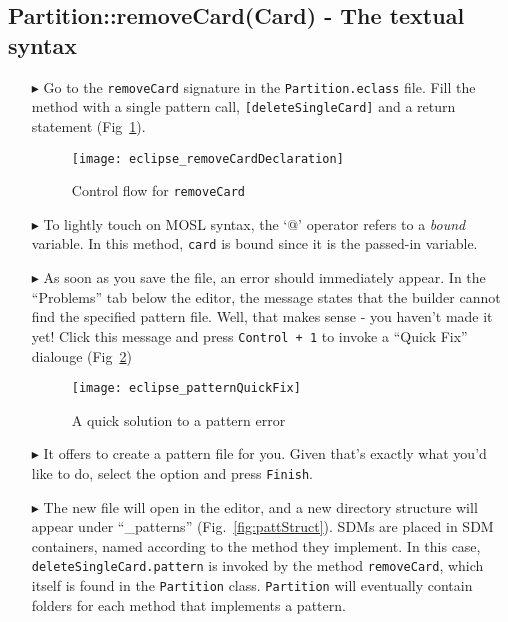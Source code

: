 \newpage
\hypertarget{remCard tex}{}
\subsection{Partition::removeCard(Card) - The textual syntax}
\texHeader

\begin{itemize}

\item[$\blacktriangleright$] Go to the \texttt{removeCard} signature in the \texttt{Partition.eclass} file. Fill the method with a single pattern call,
\texttt{[deleteSingleCard]} and a return statement (Fig~\ref{fig:remCardDec}).

\begin{figure}[htp]
\begin{center}
  \texttt{[image: eclipse\_removeCardDeclaration]}
  \caption{Control flow for \texttt{removeCard}}
  \label{fig:remCardDec}
\end{center}
\end{figure}

\item[$\blacktriangleright$] To lightly touch on MOSL syntax, the `@' operator refers to a \emph{bound} variable. In this method, \texttt{card} is bound since
it is the passed-in variable.

\item[$\blacktriangleright$] As soon as you save the file, an error should immediately appear. In the ``Problems'' tab below the editor, the message states that
the builder cannot find the specified pattern file. Well, that makes sense - you haven't made it yet! Click this message and press \texttt{Control + 1} to
invoke a ``Quick Fix'' dialouge (Fig~\ref{fig:quixFix})

\begin{figure}[htp]
\begin{center}
  \texttt{[image: eclipse\_patternQuickFix]}
  \caption{A quick solution to a pattern error}
  \label{fig:quixFix}
\end{center}
\end{figure}

\item[$\blacktriangleright$] It offers to create a pattern file for you. Given that's exactly what you'd like to do, select the option and press
\texttt{Finish}.

\item[$\blacktriangleright$] The new file will open in the editor, and a new directory structure will appear under ``\_patterns'' (Fig.~\ref{fig:pattStruct}). SDMs are
placed in SDM containers, named according to the method they implement. In this case, \texttt{deleteSingleCard.pattern} is invoked by the method \texttt{removeCard},
which itself is found in the \texttt{Partition} class. \texttt{Partition} will eventually contain folders for each method that implements a pattern.


\end{itemize}
